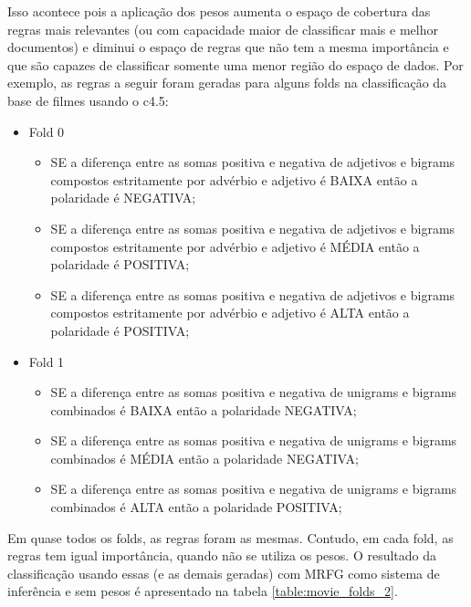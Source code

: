 \documentclass[template.tex]{subfiles}
\begin{document}
Isso acontece pois a aplicação dos pesos aumenta o espaço de cobertura das regras mais relevantes (ou com capacidade maior de classificar mais e melhor documentos) e diminui o espaço de regras que não tem a mesma importância e que são capazes de classificar somente uma menor região do espaço de dados. Por exemplo, as regras a seguir foram geradas para alguns folds na classificação da base de filmes usando o c4.5:

\begin{itemize}
\item Fold 0
\begin{itemize}
\item SE a diferença entre as somas positiva e negativa de adjetivos e bigrams compostos estritamente por advérbio e adjetivo é BAIXA então a polaridade é NEGATIVA;
\item SE a diferença entre as somas positiva e negativa de adjetivos e bigrams compostos estritamente por advérbio e adjetivo é MÉDIA então a polaridade é POSITIVA;
\item SE a diferença entre as somas positiva e negativa de adjetivos e bigrams compostos estritamente por advérbio e adjetivo é ALTA então a polaridade é POSITIVA;
\end{itemize}
\item Fold 1
\begin{itemize}
\item SE a diferença entre as somas positiva e negativa de unigrams e bigrams combinados é BAIXA então a polaridade NEGATIVA;
\item SE a diferença entre as somas positiva e negativa de unigrams e bigrams combinados é MÉDIA então a polaridade NEGATIVA;
\item SE a diferença entre as somas positiva e negativa de unigrams e bigrams combinados é ALTA então a polaridade POSITIVA;
\end{itemize}
\end{itemize}

Em quase todos os folds, as regras foram as mesmas. Contudo, em cada fold, as regras tem igual importância, quando não se utiliza os pesos. O resultado da classificação usando essas (e as demais geradas) com MRFG como sistema de inferência e sem pesos é apresentado na tabela \ref{table:movie_folds_2}.
\end{document}
